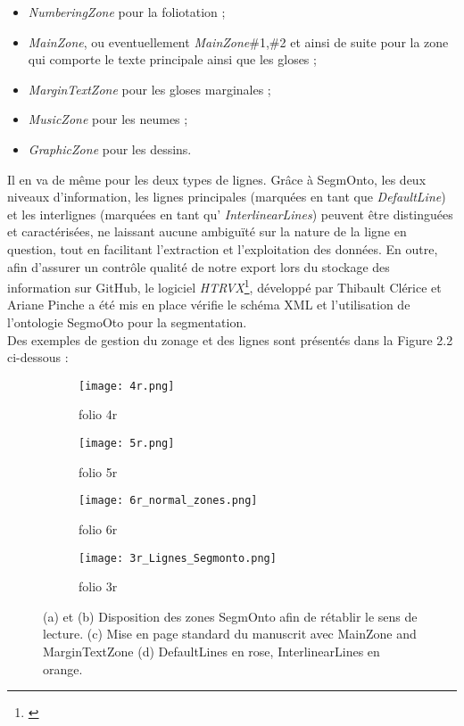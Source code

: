 \documentclass[a4paper, twoside, 12pt]{book}
\begin{document}
\begin{itemize}
    \item \textit{NumberingZone} pour la foliotation ;
    \item \textit{MainZone}, ou eventuellement \textit{MainZone}\#1,\#2 et ainsi de suite pour la zone qui comporte le texte principale ainsi que les gloses ;
    \item \textit{MarginTextZone} pour les gloses marginales ;
    \item \textit{MusicZone} pour les neumes ;
    \item \textit{GraphicZone} pour les dessins.
\end{itemize}

Il en va de même pour les deux types de lignes. Grâce à SegmOnto, les deux niveaux d'information, les lignes principales (marquées en tant que \textit{DefaultLine}) et les interlignes (marquées en tant qu' \textit{InterlinearLines}) peuvent être distinguées et caractérisées, ne laissant aucune ambiguïté sur la nature de la ligne en question, tout en facilitant l'extraction et l'exploitation des données. En outre, afin d'assurer un contrôle qualité de notre export lors du stockage des information sur GitHub, le logiciel \textit{HTRVX}\footnote{\cite{Clerice_HTRVX_HTR_Validation_2021}}, développé  par Thibault Clérice et Ariane Pinche a été mis en place vérifie le schéma XML et l’utilisation de l’ontologie SegmoOto pour la segmentation. \\


Des exemples de gestion du zonage et des lignes sont présentés dans la Figure 2.2  ci-dessous :

\begin{figure}[H]
    \begin{subfigure}{0.40\textwidth}
    \centering
    \texttt{[image: 4r.png]}
    \caption{folio 4r}
    \end{subfigure}
    \begin{subfigure}{0,40\linewidth}
    \centering
    \texttt{[image: 5r.png]}
    \caption{folio 5r}
    \end{subfigure} 
    \begin{subfigure}{0,40\linewidth}
    \centering
\texttt{[image: 6r\_normal\_zones.png]}
    \caption{ folio 6r }
    \end{subfigure}
     \begin{subfigure}{0,80\linewidth}
    \centering
\texttt{[image: 3r\_Lignes\_Segmonto.png]}
    \caption{ folio 3r }
    \end{subfigure}
    \caption{ (a) et (b) Disposition des zones SegmOnto afin de rétablir le sens de lecture. (c) Mise en page standard du manuscrit avec MainZone and MarginTextZone (d) DefaultLines en rose, InterlinearLines en orange. }
\end{figure} 
\end{document}
